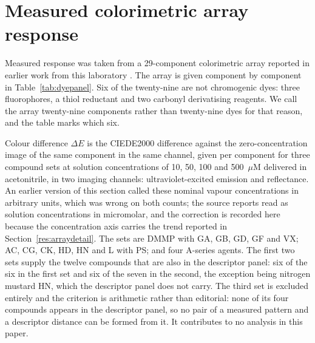 \documentclass[11pt,a4paper]{article}
\begin{document}
\section{Measured colorimetric array response}
\label{meth:deltaE}
Measured response was taken from a 29-component colorimetric array reported in
earlier work from this laboratory \cite{hazref,multiplexref,group3ref}. The
array is given component by component in Table~\ref{tab:dyepanel}. Six of the
twenty-nine are not chromogenic dyes: three fluorophores, a thiol reductant and
two carbonyl derivatising reagents. We call the array twenty-nine components
rather than twenty-nine dyes for that reason, and the table marks which six.

 Colour difference
$\Delta E$ is the CIEDE2000 difference against the zero-concentration image of
the same component in the same channel, given per component for three compound
sets at
solution concentrations of 10, 50, 100 and 500~$\mu$M delivered in
acetonitrile, in two imaging channels: ultraviolet-excited emission and
reflectance. An earlier version of this section called these nominal vapour
concentrations in arbitrary units, which was wrong on both counts; the source
reports read as solution concentrations in micromolar, and the correction is
recorded here because the concentration axis carries the trend reported in
Section~\ref{res:arraydetail}. The sets are
DMMP with GA, GB, GD, GF and VX; AC, CG, CK, HD, HN and L with PS; and four
A-series agents. The first two sets supply the twelve compounds that are also in the descriptor
panel: six of the six in the first set and six of the seven in the second, the
exception being nitrogen mustard HN, which the descriptor panel does not carry.
The third set is excluded entirely and the criterion is arithmetic rather than
editorial: none of its four compounds appears in the descriptor panel, so no
pair of a measured pattern and a descriptor distance can be formed from it. It
contributes to no analysis in this paper.
\end{document}

